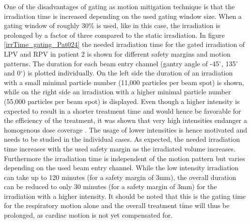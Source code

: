 \documentclass[type=dr, dr=rernat, accentcolor=tud7b,colorbacktitle, bigchapter, openright, twoside, 12pt ]{tudthesis}
\begin{document}
One of the disadvantages of gating as motion mitigation technique is that the irradiation time is increased depending on the used gating window 
size. When a gating window of roughly 30\% is used, like in this case, the irradiation is prolonged by a factor of three compared to the static 
irradiation. In figure \ref{irrTime_gating_Pat024} the needed irradiation time for the gated irradiation of LPV and RPV in patient 2 is shown for 
different safety margins and motion patterns. The duration for each beam entry channel (gantry angle of -45$^{\circ}$, 135$^{\circ}$ and 0$^{\circ}$) 
is plotted individually. On the left side the duration of an irradiation with a small minimal particle number (11,000 particles per beam spot) 
is shown, while on the right side an irradiation with a higher minimal particle number (55,000 particles per beam spot) is displayed. 
Even though a higher intensity is expected to result in a shorter treatment time and would hence be favorable for the efficiency of the 
treatment, it was shown that very high intensities endanger a homogenous dose coverage \cite{Mue14}. The usage of lower intensities is 
hence motivated and needs to be studied in the individual cases.\newline
\newline
As expected, the needed irradiation time increases with the used safety margin as the irradiated volume increases. Furthermore 
the irradiation time is independent of the motion pattern but varies depending on the used beam entry channel. While the low intensity 
irradiation can take up to 120 minutes (for a safety margin of 3mm), the overall duration can be reduced to only 30 minutes (for a safety 
margin of 3mm) for the irradiation with a higher intensity. It should be noted that this is the gating time for the respiratory motion alone 
and the overall treatment time will thus be prolonged, as cardiac motion is not yet compensated for. 

\vspace*{0.6cm}
\end{document}
